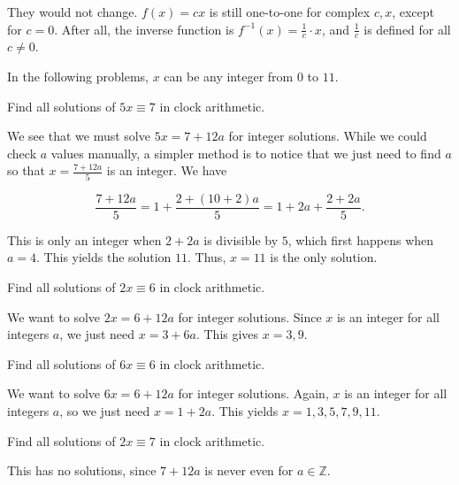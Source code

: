 \documentclass[../gatm_answers.tex]{subfiles}
\begin{document}
They would not change. $f(x)=cx$ is still one-to-one for complex $c,x$, except for $c=0$. After all, the inverse function is $f^{-1}(x)=\frac{1}{c}\cdot x$, and $\frac{1}{c}$ is defined for all $c\neq 0$.

\begin{outer_problem}
\item In the following problems, $x$ can be any integer from $0$ to $11$.
\end{outer_problem}

\begin{inner_problem}[start=1]
\item Find all solutions of $5x\equiv 7$ in clock arithmetic.
\end{inner_problem}

We see that we must solve $5x = 7+12a$ for integer solutions. While we could check $a$ values manually, a simpler method is to notice that we just need to find $a$ so that $x=\frac{7+12a}{5}$ is an integer. We have

$$\frac{7+12a}{5} = 1+\frac{2+(10+2)a}{5} = 1+2a+\frac{2+2a}{5}.$$

This is only an integer when $2+2a$ is divisible by $5$, which first happens when $a=4$. This yields the solution $11$. Thus, $x=11$ is the only solution.

\begin{inner_problem}
\item Find all solutions of $2x\equiv 6$ in clock arithmetic.
\end{inner_problem}

We want to solve $2x=6+12a$ for integer solutions. Since $x$ is an integer for all integers $a$, we just need $x=3+6a$. This gives $x=3,9$.

\begin{inner_problem}
\item Find all solutions of $6x\equiv 6$ in clock arithmetic.
\end{inner_problem}

We want to solve $6x=6+12a$ for integer solutions. Again, $x$ is an integer for all integers $a$, so we just need $x=1+2a$. This yields $x=1,3,5,7,9,11$.

\begin{inner_problem}
\item Find all solutions of $2x\equiv 7$ in clock arithmetic.
\end{inner_problem}

This has no solutions, since $7+12a$ is never even for $a\in\mathbb{Z}$.
\end{document}
